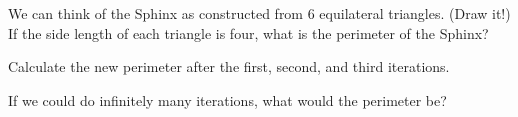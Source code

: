 \begin{prob}
 We can think of the Sphinx as constructed from 6 equilateral triangles.  (Draw it!)  If the side length of each triangle is four, what is the perimeter of the Sphinx?
 \end{prob}

\begin{prob}
 Calculate the new perimeter after the first, second, and third iterations.
 \end{prob}

\begin{prob}
  If we could do infinitely many iterations, what would the perimeter be?
  \end{prob}

